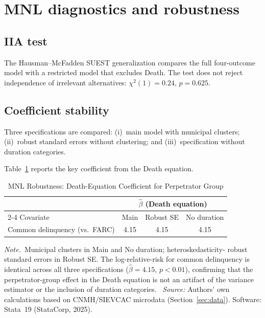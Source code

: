 \documentclass[ecta,nameyear,final,supplement]{econsocart}
\numberwithin{equation}{section}
\numberwithin{table}{section}
\newcommand{\tabnote}{\par\addvspace{0.4em}\noindent\emph{Note.}}
\newcommand{\tabsource}{\ \textit{Source:} Authors' own calculations based on
CNMH/SIEVCAC microdata (Section~\ref{sec:data}). Software: Stata~19
(StataCorp, 2025).}
\begin{document}
\section{MNL diagnostics and robustness}
\label{sec:mnl-diag}

\subsection{IIA test}

The Hausman--McFadden \citep{HausmanMcFadden1984} SUEST generalization
\citep{Weesie1999} compares the full four-outcome model with a restricted
model that excludes Death. The test does not reject independence of
irrelevant alternatives: $\chi^2(1)=0.24$, $p=0.625$.

\subsection{Coefficient stability}

Three specifications are compared: (i)~main model with municipal clusters;
(ii)~robust standard errors without clustering; and (iii)~specification
without duration categories.

Table~\ref{tab:robust} reports the key coefficient from the Death equation.

\begin{table}[t]
\centering
\caption{MNL Robustness: Death-Equation Coefficient for Perpetrator Group}
\label{tab:robust}
\small
\begin{tabular}{@{}lccc@{}}
\toprule
 & \multicolumn{3}{c}{$\hat\beta$ (Death equation)} \\
\cmidrule(lr){2-4}
Covariate & Main & Robust SE & No duration \\
\midrule
Common delinquency (vs.\ FARC) & 4.15 & 4.15 & 4.15 \\
\bottomrule
\end{tabular}
\tabnote\ Municipal clusters in Main and No duration; heteroskedasticity-
robust standard errors in Robust SE. The log-relative-risk for common
delinquency is identical across all three specifications ($\hat\beta=4.15$,
$p<0.01$), confirming that the perpetrator-group effect in the Death equation
is not an artifact of the variance estimator or the inclusion of duration
categories.
\tabsource
\end{table}
\end{document}
